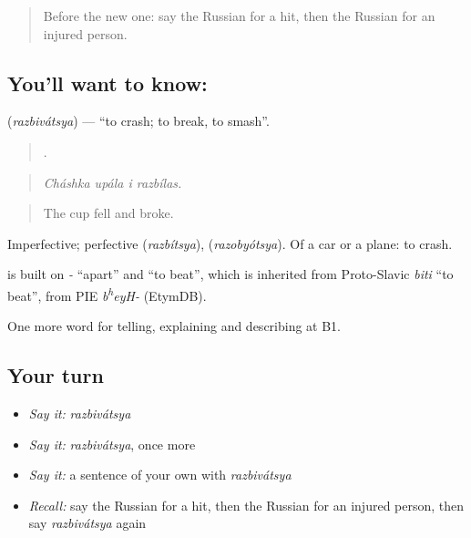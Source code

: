 \label{lesson:RU-C298-razbivatsya}



\begin{quote}
Before the new one: say the Russian for a hit, then the Russian for an injured person.
\end{quote}

\subsection*{You'll want to know: }
\textbf{} (\emph{razbivátsya}) — \textquotedblleft{}to crash; to break, to smash\textquotedblright{}.

\begin{quote}
   .
\end{quote}

\begin{quote}
\emph{Cháshka upála i razbílas.}
\end{quote}

\begin{quote}
The cup fell and broke.
\end{quote}

Imperfective; perfective \emph{} (\emph{razbítsya}), \emph{} (\emph{razobyótsya}). Of a car or a plane: to crash.

\begin{cousinweb}
\emph{} is built on \emph{-} \textquotedblleft{}apart\textquotedblright{} and \emph{} \textquotedblleft{}to beat\textquotedblright{}, which is inherited from Proto-Slavic \emph{biti} \textquotedblleft{}to beat\textquotedblright{}, from PIE \emph{b\textsuperscript{h}eyH-} (EtymDB).
\end{cousinweb}

\begin{grammarlens}[title={What you've built}]
One more word for telling, explaining and describing at B1.
\end{grammarlens}

\subsection*{Your turn}
\begin{itemize}
\raggedright
  \item \emph{Say it:} \emph{razbivátsya}
  \item \emph{Say it:} \emph{razbivátsya}, once more
  \item \emph{Say it:} a sentence of your own with \emph{razbivátsya}
  \item \emph{Recall:} say the Russian for a hit, then the Russian for an injured person, then say \emph{razbivátsya} again
\end{itemize}

